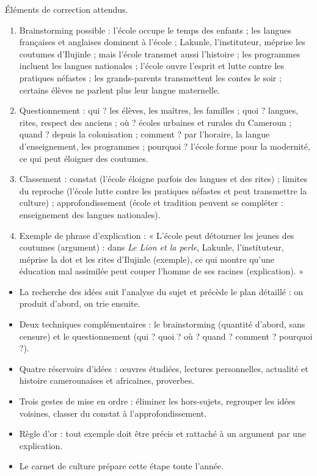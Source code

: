 \documentclass[11pt]{article}
\newcommand{\cle}[1]{{\popxbold\color{popdark}#1}}
\begin{document}
\begin{corrige}
Éléments de correction attendus.
\begin{enumerate}
\item Brainstorming possible : l'école occupe le temps des enfants ; les langues françaises et anglaises dominent à l'école ; Lakunle, l'instituteur, méprise les coutumes d'Ilujinle ; mais l'école transmet aussi l'histoire ; les programmes incluent les langues nationales ; l'école ouvre l'esprit et lutte contre les pratiques néfastes ; les grands-parents transmettent les contes le soir ; certains élèves ne parlent plus leur langue maternelle.
\item Questionnement : qui ? les élèves, les maîtres, les familles ; quoi ? langues, rites, respect des anciens ; où ? écoles urbaines et rurales du Cameroun ; quand ? depuis la colonisation ; comment ? par l'horaire, la langue d'enseignement, les programmes ; pourquoi ? l'école forme pour la modernité, ce qui peut éloigner des coutumes.
\item Classement : constat (l'école éloigne parfois des langues et des rites) ; limites du reproche (l'école lutte contre les pratiques néfastes et peut transmettre la culture) ; approfondissement (école et tradition peuvent se compléter : enseignement des langues nationales).
\item Exemple de phrase d'explication : « L'école peut détourner les jeunes des coutumes (argument) : dans \emph{Le Lion et la perle}, Lakunle, l'instituteur, méprise la dot et les rites d'Ilujinle (exemple), ce qui montre qu'une éducation mal assimilée peut couper l'homme de ses racines (explication). »
\end{enumerate}
\end{corrige}

\begin{aretenir}
\begin{itemize}
\item La recherche des idées suit l'analyse du sujet et précède le plan détaillé : on produit d'abord, on trie ensuite.
\item Deux techniques complémentaires : le \cle{brainstorming} (quantité d'abord, sans censure) et le \cle{questionnement} (qui ? quoi ? où ? quand ? comment ? pourquoi ?).
\item Quatre réservoirs d'idées : œuvres étudiées, lectures personnelles, actualité et histoire camerounaises et africaines, proverbes.
\item Trois gestes de mise en ordre : éliminer les hors-sujets, regrouper les idées voisines, classer du constat à l'approfondissement.
\item Règle d'or : tout exemple doit être précis et rattaché à un argument par une explication.
\item Le carnet de culture prépare cette étape toute l'année.
\end{itemize}
\end{aretenir}
\end{document}
